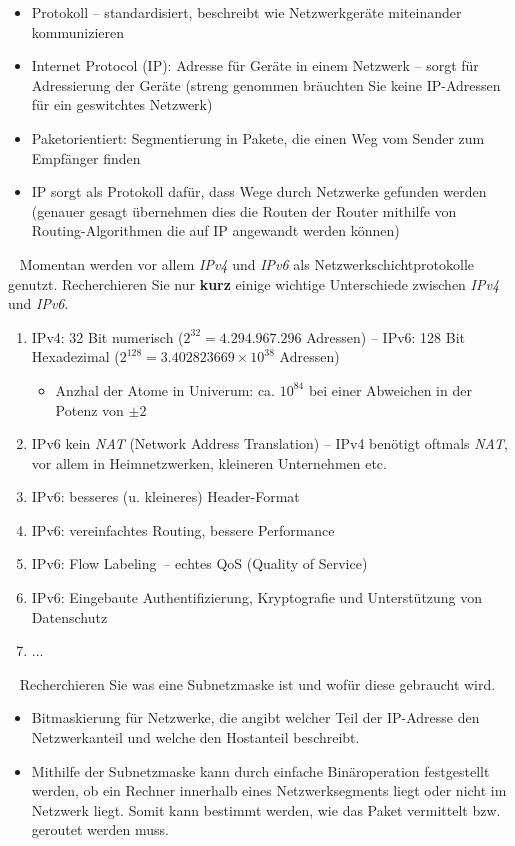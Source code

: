 \documentclass[paper=a4,fontsize=11pt]{scrartcl}%
\numberwithin{equation}{section}
\begin{document}
\begin{itemize}
\begin{tasks}
\begin{itemize}
		\item Protokoll -- standardisiert, beschreibt wie Netzwerkgeräte miteinander kommunizieren
		\item Internet Protocol (IP): Adresse für Geräte in einem Netzwerk -- sorgt für Adressierung der Geräte (streng genommen bräuchten Sie keine IP-Adressen für ein geswitchtes Netzwerk)
		\item Paketorientiert: Segmentierung in Pakete, die einen Weg vom Sender zum Empfänger finden
		\item IP sorgt als Protokoll dafür, dass Wege durch Netzwerke gefunden werden (genauer gesagt übernehmen dies die Routen der Router mithilfe von Routing-Algorithmen die auf IP angewandt werden können)
	\end{itemize}
	\task~ Momentan werden vor allem \emph{IPv4} und \emph{IPv6} als Netzwerkschichtprotokolle genutzt. Recherchieren Sie nur \textbf{kurz} einige wichtige Unterschiede zwischen \emph{IPv4} und \emph{IPv6}.
	\begin{enumerate}
		\item IPv4: 32 Bit numerisch ($2^{32} = 4.294.967.296$ Adressen) -- IPv6: 128 Bit Hexadezimal ($2^{128} = 3.402823669 \times 10^{38}$ Adressen) 
		\begin{itemize}
			\item Anzhal der Atome in Univerum: ca. $10^{84}$ bei einer Abweichen in der Potenz von $\pm 2$
		\end{itemize}
		\item IPv6 kein \emph{NAT} (Network Address Translation) -- IPv4 benötigt oftmals \emph{NAT}, vor allem in Heimnetzwerken, kleineren Unternehmen etc.
		\item IPv6: besseres (u. kleineres) Header-Format
		\item IPv6: vereinfachtes Routing, bessere Performance
		\item IPv6: \glqq Flow Labeling\grqq\ -- echtes QoS (Quality of Service)
		\item IPv6: Eingebaute Authentifizierung, Kryptografie und Unterstützung von Datenschutz
		\item ...
	\end{enumerate}
	\task~ Recherchieren Sie was eine Subnetzmaske ist und wofür diese gebraucht wird.
	\begin{itemize}
		\item Bitmaskierung für Netzwerke, die angibt welcher Teil der IP-Adresse den Netzwerkanteil und welche den Hostanteil beschreibt.
		\item Mithilfe der Subnetzmaske kann durch einfache Binäroperation festgestellt werden, ob ein Rechner innerhalb eines Netzwerksegments liegt oder nicht im Netzwerk liegt. Somit kann bestimmt werden, wie das Paket vermittelt bzw. geroutet werden muss.

\end{itemize}
\end{tasks}
\end{itemize}
\end{document}
